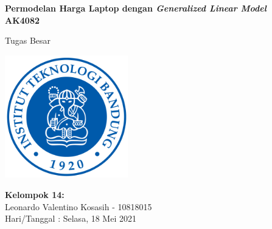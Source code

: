 \documentclass[12pt]{article}
\begin{document}
\begin{titlepage}
    \begin{center}
        \vspace*{1cm}
            
        \Huge
        \textbf{Permodelan Harga Laptop dengan \textit{Generalized Linear Model} \\ AK4082}
            
        \vspace{0.5cm}
        \LARGE
        Tugas Besar

            
        \vspace{1.5cm}
        \includegraphics[width=0.4\textwidth]{logo_itb_1024.png}
        \\
        
        \vspace{1cm}
        
        \Large
                \textbf{Kelompok 14:}\\
        Leonardo Valentino Kosasih - 10818015 \\
        Hari/Tanggal : Selasa, 18 Mei 2021
    \end{center}
\end{titlepage}
\newpage
\tableofcontents
\newpage
\listoffigures
\newpage
\end{document}
